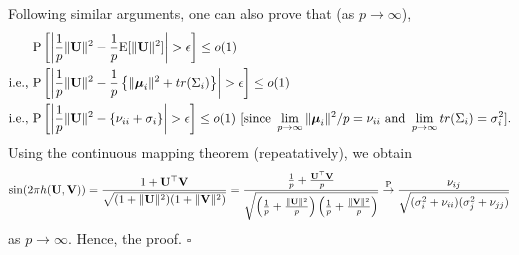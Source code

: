 \documentclass[twoside]{article}
\newcommand{\bU}{\mathbf{U}}
\newcommand{\bV}{\mathbf{V}}
\newcommand{\bmu}{\boldsymbol{\mu}}
\newcommand{\0}{\mathbf{0}}
\newcommand{\1}{\mathbf{1}}
\newcommand*{\QEDB}{\hfill\ensuremath{\square}}
\numberwithin{equation}{section}
\begin{document}
Following similar arguments, one can also prove that (as $p\to\infty$),
\begin{align*}
&\ {\rm P}\left [\left |\frac{1}{p}\|\bU\|^2 - \frac{1}{p}{\rm E}[\|\bU\|^2]\right |>\epsilon\right ]\leq o(1)\\
\text{i.e.,} &\ {\rm P}\left [\left |\frac{1}{p}\|\bU\|^2 - \frac{1}{p}\left \{\|\bmu_i\|^2 + tr (\Sigma_i)\right \}\right |>\epsilon\right ]\leq o(1)\\
\text{i.e.,} &\ {\rm P}\left [\left |\frac{1}{p}\|\bU\|^2 - \left \{\nu_{ii} + \sigma_i\right \}\right |>\epsilon\right ]\leq o(1)\ [\text{since }\lim_{p\to\infty}\|\bmu_i\|^2/p=\nu_{ii}\text{ and }\lim_{p\to\infty}tr (\Sigma_i)=\sigma^2_i].
\end{align*}
Using the continuous mapping theorem (repeatatively), we obtain
$$\sin (2\pi h(\bU,\bV))=\frac{1+\bU^\top\bV}{\sqrt{(1+\|\bU\|^2)(1+\|\bV\|^2)}}=\frac{\frac{1}{p}+\frac{\bU^\top\bV}{p}}{\sqrt{\left (\frac{1}{p}+\frac{\|\bU\|^2}{p}\right )\left(\frac{1}{p}+\frac{\|\bV\|^2}{p}\right)}}\stackrel{\rm P}{\to}\frac{\nu_{ij}}{\sqrt{(\sigma^2_i+\nu_{ii})(\sigma^2_j+\nu_{jj})}}$$ as $p\to\infty$. Hence, the proof. \hfill\QEDB\newline
\end{document}
